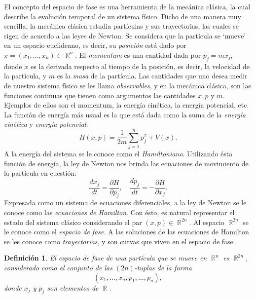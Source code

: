 \documentclass[a4paper]{report}
\DeclareMathOperator{\R}{\mathbb{R}}
\newtheorem{definition}{Definición}
\begin{document}
  El concepto del espacio de fase es una herramienta de la
  mecánica clásica, la cual describe la evolución temporal
  de un sistema físico. Dicho de una manera muy sencilla, la
  mecánica clásica estudia partículas y sus trayectorias,
  las cuales se rigen de acuerdo a las leyes de Newton.  Se
  considera que la partícula se `mueve' en un espacio
  euclideano, es decir, su \textit{posición} está dado por
  $x = (x_1,\ldots,x_n) \in \R^{n}$. El
  \textit{momentum} es una cantidad dada por $p_j = m \dot
  x_j$, donde $\dot x$ es la derivada respecto al
  tiempo de la posición, es decir, la velocidad de la
  partícula, y $m$ es la \textit{masa} de la partícula. Las
  cantidades que uno desea medir de nuestro sistema físico
  se les llama \textit{observables}, y en la mecánica
  clásica, son las funciones continuas que tienen como
  argumentos las cantidades $x,p$ y $m$. Ejemplos
  de ellos son el momentum, la energía cinética, la energía
  potencial, etc. La función de energía más usual es la que
  está dada como la suma de la \textit{energía cinética} y
  \textit{energía potencial}:
  \begin{equation}
    H(x,p)
    = \frac{1}{2m} \sum_{j=1}^{n} p_j^2 + V(x).
  \end{equation}
  A la energía del sistema se le conoce como el
  \textit{Hamiltoniano}.  Utilizando ésta función de
  energía, la ley de Newton nos brinda las ecuaciones de
  movimiento de la partícula en cuestión:
  \begin{equation}
    \frac{dx_j}{dt}
    = \frac{\partial H}{\partial p_j},
    \quad
    \frac{dp_j}{dt}
    = -\frac{\partial H}{\partial x_j}.
  \end{equation}
  Expresada como un sistema de ecuaciones diferenciales, a
  la ley de Newton se le conoce como las \textit{ecuaciones
  de Hamilton}. Con ésto, es natural representar el estado
  del sistema clásico considerando el par $(x,p) \in
  \R^{2n}$. Al espacio $\R^{2n}$ se le conoce como el
  \textit{espacio de fase}. A las soluciones de las
  ecuaciones de Hamilton se les conoce como
  \textit{trayectorias}, y son curvas que viven en el
  espacio de fase.
  \begin{definition}
    El espacio de fase de una partícula que se mueve en
    $\R^{n}$ es $\R^{2n}$, considerado como el conjunto de
    las $(2n)$-tuplas de la forma
    \[
      \left(
        x_1, \ldots, x_n, p_1, \ldots, p_n
      \right),
    \] 
    donde $x_j$ y $p_j$ son elementos de $\R$.
  \end{definition}
\end{document}
